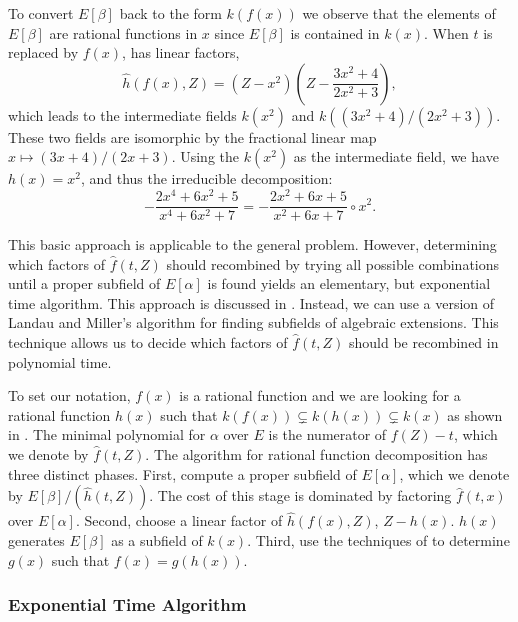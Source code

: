 To convert $E[\beta]$ back to the form $k(f(x))$ we observe that the
elements of $E[\beta]$ are rational functions in $x$ since $E[\beta]$
is contained in $k(x)$.  When $t$ is replaced by $f(x)$,  has
linear factors, \viz
\[
\hat{h}(f(x), Z) = \left(Z - x^2\right)\left(Z - \frac{3x^2+4}{2x^2+3}\right),
\]
which leads to the intermediate fields $k(x^2)$ and
$k((3x^2+4)/(2x^2+3))$.  These two fields are isomorphic by the
fractional linear map $x \mapsto (3x+4)/(2x+3)$.  Using the $k(x^2)$ as the
intermediate field, we have $h(x) = x^2$, and thus the irreducible
decomposition:
\[
- \frac{2x^4 + 6 x^2 + 5}{x^4 + 6 x^2 + 7} = - \frac{2x^2 + 6 x + 5}{x^2 +
6 x + 7} \circ x^2.
\]

\medskip

This basic approach is applicable to the general problem.  However,
determining which factors of $\hat{f}(t, Z)$ should recombined by
trying all possible combinations until a proper subfield of
$E[\alpha]$ is found yields an elementary, but exponential time
algorithm.  This approach is discussed in
.  Instead, we can use a version of 
Landau and Miller's algorithm \cite{Landau1985-en} for
finding subfields of algebraic extensions.  This technique allows us
to decide which factors of $\hat{f}(t, Z)$ should be recombined in
polynomial time.

To set our notation, $f(x)$ is a rational function and we are looking for a
rational function $h(x)$ such that $k(f(x)) \varsubsetneq k(h(x))
\varsubsetneq k(x)$ as shown in .  The
minimal polynomial for $\alpha$ over $E$ is the numerator of $f(Z)- t$,
which we denote by $\hat{f}(t, Z)$.  The algorithm for rational function
decomposition has three distinct phases.  First, compute a proper subfield
of $E[\alpha]$, which we denote by $E[\beta]/(\hat{h}(t, Z))$.  The 
cost of this stage is dominated by factoring $\hat{f}(t, x)$ over $E[\alpha]$.
Second, choose a linear factor of $\hat{h}(f(x), Z)$, $Z - h(x)$.  $h(x)$
generates $E[\beta]$ as a subfield of $k(x)$.  Third, use the techniques of
 to determine $g(x)$ such that $f(x) = g(h(x))$.

\subsubsection{Exponential Time Algorithm}
\label{Exponential:Alg:Sec}

